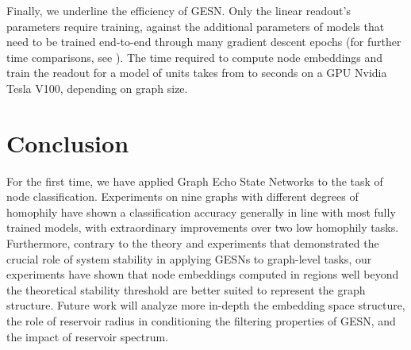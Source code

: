\documentclass{esannV2p}
\begin{document}
Finally, we underline the efficiency of GESN.
Only the linear readout's  parameters require training, against the additional  parameters of models that need to be trained end-to-end through many gradient descent epochs (for further time comparisons, see \cite{Gallicchio2020}).
The time required to compute node embeddings and train the readout for a model of  units takes from  to  seconds on a GPU Nvidia Tesla V100, depending on graph size.

\section{Conclusion}\label{sec:conclusion}
For the first time, we have applied Graph Echo State Networks to the task of node classification.
Experiments on nine graphs with different degrees of homophily have shown a classification accuracy generally in line with most fully trained models, with extraordinary improvements over two low homophily tasks.
Furthermore, contrary to the theory and experiments that demonstrated the crucial role of system stability in applying GESNs to graph-level tasks, our experiments have shown that node embeddings computed in regions well beyond the theoretical stability threshold are better suited to represent the graph structure.
Future work will analyze more in-depth the embedding space structure, the role of reservoir radius in conditioning the filtering properties of GESN, and the impact of reservoir spectrum.


\begin{footnotesize}





\end{footnotesize}
\end{document}
